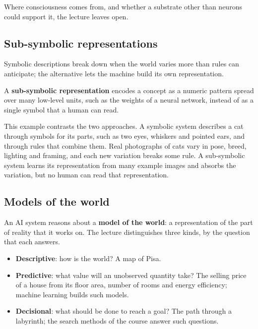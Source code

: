 Where consciousness comes from, and whether a substrate other than neurons
could support it, the lecture leaves open.

\subsection{Sub-symbolic representations}\label{sec:intro-subsymbolic}

Symbolic descriptions break down when the world varies more than rules can
anticipate; the alternative lets the machine build its own representation.

\begin{definition}\label{def:subsymbolic}
  A \textbf{sub-symbolic representation} encodes a concept as a numeric pattern
  spread over many low-level units, such as the weights of a neural network,
  instead of as a single symbol that a human can read.
\end{definition}

\begin{example}\label{ex:cat}
  This example contrasts the two approaches. A symbolic system describes a cat
  through symbols for its parts, such as two eyes, whiskers and pointed ears,
  and through rules that combine them. Real photographs of cats vary in pose,
  breed, lighting and framing, and each new variation breaks some rule. A
  sub-symbolic system learns its representation from many example images and
  absorbs the variation, but no human can read that representation.
\end{example}

\subsection{Models of the world}\label{sec:intro-models}

An AI system reasons about a \textbf{model of the world}: a representation of
the part of reality that it works on. The lecture distinguishes three kinds, by
the question that each answers.
\begin{itemize}
  \item \textbf{Descriptive}: how is the world? A map of Pisa.
  \item \textbf{Predictive}: what value will an unobserved quantity take? The
    selling price of a house from its floor area, number of rooms and energy
    efficiency; machine learning builds such models.
  \item \textbf{Decisional}: what should be done to reach a goal? The path
    through a labyrinth; the search methods of the course answer such
    questions.
\end{itemize}

